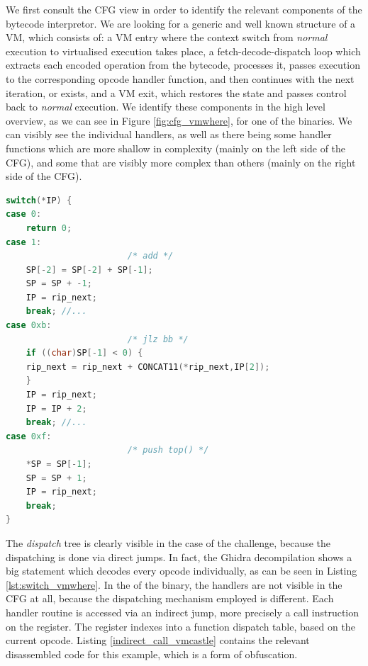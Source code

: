 We first consult the \gls{CFG} view in order to identify the relevant components of the bytecode interpretor. We are looking for a generic and well known structure of a \gls{VM}, which consists of: a \gls{VM} entry where the context switch from \emph{normal} execution to virtualised execution takes place, a fetch-decode-dispatch loop which extracts each encoded operation from the bytecode, processes it, passes execution to the corresponding opcode handler function, and then continues with the next iteration, or exists, and a \gls{VM} exit, which restores the state and passes control back to \emph{normal} execution. We identify these components in the high level overview, as we can see in Figure \ref{fig:cfg_vmwhere}, for one of the binaries. We can visibly see the individual handlers, as well as there being some handler functions which are more shallow in complexity (mainly on the left side of the \gls{CFG}), and some that are visibly more complex than others (mainly on the right side of the \gls{CFG}). 

\begin{lstlisting}[language=c, label={lst:switch_vmwhere}, caption={TODO, also, maybe mention that this result is not natural decompilation, but the final result after work}]
switch(*IP) {
case 0:
    return 0;
case 1:
                        /* add */
    SP[-2] = SP[-2] + SP[-1];
    SP = SP + -1;
    IP = rip_next;
    break; //...
case 0xb:
                        /* jlz bb */
    if ((char)SP[-1] < 0) {
    rip_next = rip_next + CONCAT11(*rip_next,IP[2]);
    }
    IP = rip_next;
    IP = IP + 2;
    break; //...
case 0xf:
                        /* push top() */
    *SP = SP[-1];
    SP = SP + 1;
    IP = rip_next;
    break;
}
\end{lstlisting}

The \emph{dispatch} tree is clearly visible in the case of the  challenge, because the dispatching is done via direct jumps. In fact, the Ghidra decompilation shows a big  statement which decodes every opcode individually, as can be seen in Listing \ref{lst:switch_vmwhere}. In the of the  binary, the handlers are not visible in the \gls{CFG} at all, because the dispatching mechanism employed is different. Each handler routine is accessed via an indirect jump, more precisely a call instruction on the  register. The  register indexes into a function dispatch table, based on the current opcode. Listing \ref{indirect_call_vmcastle} contains the relevant disassembled code for this example, which is a form of obfuscation.

